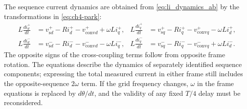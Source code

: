 The sequence current dynamics are obtained from \eqref{eq:li_dynamics_ab} by the transformations in \eqref{eq:ch4-park}:
\begin{equation}\label{eq:li_wu_dq_expanded}
\begin{aligned}
L\frac{di_d^+}{dt}&=v_{\mathrm{s}d}^+-Ri_d^+-v_{\mathrm{conv}d}^++\omega Li_q^+,&
L\frac{di_q^+}{dt}&=v_{\mathrm{s}q}^+-Ri_q^+-v_{\mathrm{conv}q}^+-\omega Li_d^+,\\
L\frac{di_d^-}{dt}&=v_{\mathrm{s}d}^--Ri_d^--v_{\mathrm{conv}d}^--\omega Li_q^-,&
L\frac{di_q^-}{dt}&=v_{\mathrm{s}q}^--Ri_q^--v_{\mathrm{conv}q}^-+\omega Li_d^- .
\end{aligned}
\end{equation}
The opposite signs of the cross-coupling terms follow from opposite frame rotation. The equations describe the dynamics of separately identified sequence components; expressing the total measured current in either frame still includes the opposite-sequence \(2\omega\) term. If the grid frequency changes, \(\omega\) in the frame equations is replaced by \(d\theta/dt\), and the validity of any fixed \(T/4\) delay must be reconsidered.

